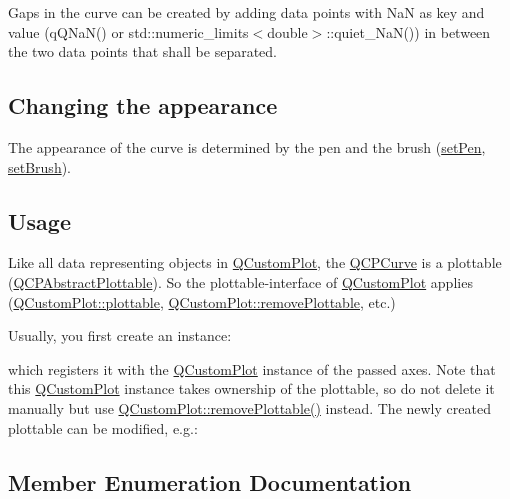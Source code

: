 Gaps in the curve can be created by adding data points with NaN as key and value ({\ttfamily q\+Q\+Na\+N()} or {\ttfamily std\+::numeric\+\_\+limits$<$double$>$\+::quiet\+\_\+\+Na\+N()}) in between the two data points that shall be separated.\hypertarget{class_q_c_p_curve_qcpcurve-appearance}{}\subsection{Changing the appearance}\label{class_q_c_p_curve_qcpcurve-appearance}
The appearance of the curve is determined by the pen and the brush (\mbox{\hyperlink{class_q_c_p_abstract_plottable_ab74b09ae4c0e7e13142fe4b5bf46cac7}{set\+Pen}}, \mbox{\hyperlink{class_q_c_p_abstract_plottable_a7a4b92144dca6453a1f0f210e27edc74}{set\+Brush}}).\hypertarget{class_q_c_p_curve_qcpcurve-usage}{}\subsection{Usage}\label{class_q_c_p_curve_qcpcurve-usage}
Like all data representing objects in \mbox{\hyperlink{class_q_custom_plot}{Q\+Custom\+Plot}}, the \mbox{\hyperlink{class_q_c_p_curve}{Q\+C\+P\+Curve}} is a plottable (\mbox{\hyperlink{class_q_c_p_abstract_plottable}{Q\+C\+P\+Abstract\+Plottable}}). So the plottable-\/interface of \mbox{\hyperlink{class_q_custom_plot}{Q\+Custom\+Plot}} applies (\mbox{\hyperlink{class_q_custom_plot_a32de81ff53e263e785b83b52ecd99d6f}{Q\+Custom\+Plot\+::plottable}}, \mbox{\hyperlink{class_q_custom_plot_af3dafd56884208474f311d6226513ab2}{Q\+Custom\+Plot\+::remove\+Plottable}}, etc.)

Usually, you first create an instance\+: 
\begin{DoxyCodeInclude}{0}
\end{DoxyCodeInclude}
which registers it with the \mbox{\hyperlink{class_q_custom_plot}{Q\+Custom\+Plot}} instance of the passed axes. Note that this \mbox{\hyperlink{class_q_custom_plot}{Q\+Custom\+Plot}} instance takes ownership of the plottable, so do not delete it manually but use \mbox{\hyperlink{class_q_custom_plot_af3dafd56884208474f311d6226513ab2}{Q\+Custom\+Plot\+::remove\+Plottable()}} instead. The newly created plottable can be modified, e.\+g.\+: 
\begin{DoxyCodeInclude}{0}
\end{DoxyCodeInclude}


\subsection{Member Enumeration Documentation}
\mbox{\label{class_q_c_p_curve_a2710e9f79302152cff794c6e16cc01f1}} 
